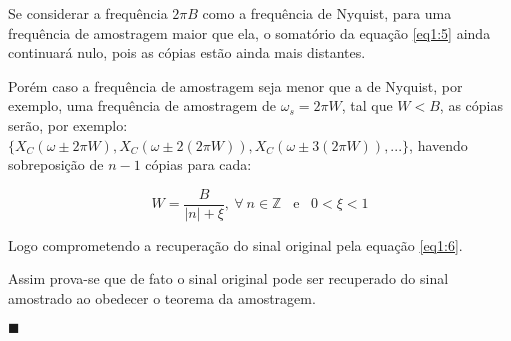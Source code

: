 Se considerar a frequência $2\pi B$ como a frequência de Nyquist, para uma frequência de amostragem maior que ela, o somatório da equação \ref{eq1:5} ainda continuará nulo, pois as cópias estão ainda mais distantes. 

Porém caso a frequência de amostragem seja menor que a de Nyquist, por exemplo, uma frequência de amostragem de $\omega_s = 2\pi W$, tal que $W<B$, as cópias serão, por exemplo: $\{X_C(\omega \pm 2\pi W), X_C(\omega \pm 2(2\pi W)), X_C(\omega \pm 3(2\pi W)), ...\}$, havendo sobreposição de $n-1$ cópias para cada: 

\begin{equation}
    W = \frac{B}{|n|+\xi}, \: \forall \: n \in \mathbb{Z} \; \; \; \text{e} \; \; \; 0<\xi<1
\end{equation}

Logo comprometendo a recuperação do sinal original pela equação \ref{eq1:6}.

Assim prova-se que de fato o sinal original pode ser recuperado do sinal amostrado ao obedecer o teorema da amostragem.

\begin{flushright}
    $\blacksquare$
\end{flushright}

